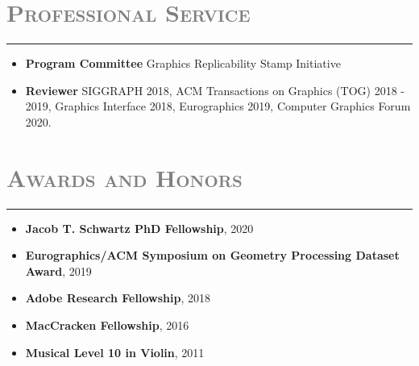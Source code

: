 \documentclass[letterpaper,11pt]{article}
\newcommand{\resheading}[1]{
\vspace{0pt}
\section*{\scshape \textcolor{gray}{#1}}
\rule{\textwidth}{0.5pt}
  \vspace{-15pt}
}
\begin{document}
\resheading{Professional Service}
\vspace{-2pt}
\begin{itemize}[label=,leftmargin=*]
\item \textbf{Program Committee}
Graphics Replicability Stamp Initiative
\item \textbf{Reviewer}
SIGGRAPH 2018,
ACM Transactions on Graphics (TOG) 2018 - 2019,
Graphics Interface 2018, Eurographics 2019,
Computer Graphics Forum 2020.
\end{itemize}
\resheading{Awards and Honors}
	\vspace{-2pt}
\begin{itemize}[label=,leftmargin=*,itemsep=-1.5pt]
\item \textbf{Jacob T. Schwartz PhD Fellowship}, 2020\\
\item \textbf{Eurographics/ACM Symposium on Geometry Processing Dataset Award}, 2019 \\
\item \textbf{Adobe Research Fellowship}, 2018\\
\item
\textbf{MacCracken Fellowship}, 2016\\
\item
\textbf{Musical Level 10 in Violin}, 2011\\
\end{itemize}
\end{document}
